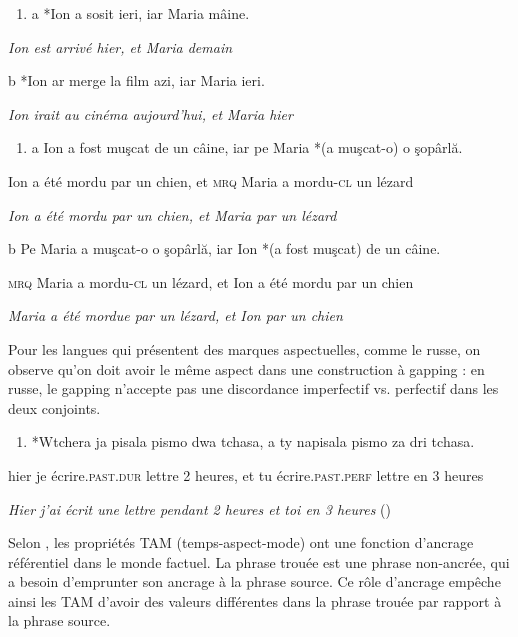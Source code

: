 \begin{enumerate}
\item \label{bkm:Ref289297914}a  *Ion a sosit ieri, iar Maria mâine.


\end{enumerate}
{\itshape
Ion est arrivé hier, et Maria demain}

  b  *Ion ar merge la film azi, iar Maria ieri.

    \textit{Ion irait au cinéma aujourd'hui, et Maria hier}


\begin{enumerate}
\item \label{bkm:Ref289298087}a  Ion a fost muşcat de un câine, iar pe Maria *(a muşcat-o) o şopârlă.


\end{enumerate}
Ion a été mordu par un chien, et \textsc{mrq} Maria a mordu-\textsc{cl} un lézard

{\itshape
Ion a été mordu par un chien, et Maria par un lézard}

  b  Pe Maria a muşcat-o o şopârlă, iar Ion *(a fost muşcat) de un câine.

    \textsc{mrq} Maria a mordu-\textsc{cl} un lézard, et Ion a été mordu par un chien 

    \textit{Maria a été mordue par un lézard, et Ion par un chien}

Pour les langues qui présentent des marques aspectuelles, comme le russe, on observe qu'on doit avoir le même aspect dans une construction à gapping : en russe, le gapping n'accepte pas une discordance imperfectif vs. perfectif dans les deux conjoints.


\begin{enumerate}
\item *Wtchera ja pisala    pismo dwa tchasa, a ty napisala pismo  za dri tchasa. 


\end{enumerate}
  hier     je écrire.\textsc{past.dur} lettre 2 heures,  et tu écrire.\textsc{past.perf} lettre en 3 heures

  \textit{Hier j'ai écrit une lettre pendant 2 heures et toi en 3 heures}        (\citet[9]{Repp2009})

Selon \citet{Repp2009}, les propriétés TAM (temps-aspect-mode) ont une fonction d'ancrage référentiel dans le monde factuel. La phrase trouée est une phrase non-ancrée, qui a besoin d'emprunter son ancrage à la phrase source. Ce rôle d'ancrage empêche ainsi les TAM d'avoir des valeurs différentes dans la phrase trouée par rapport à la phrase source.


